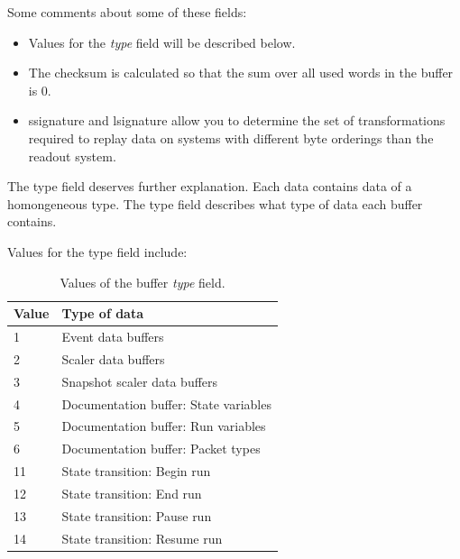    \begin{note}
   Some comments about some of these fields:
      \begin{itemize}
         \item Values for the {\em type} field will be described
            below.
         \item The checksum is calculated so that the sum over all
            used words in the buffer is 0.
         \item ssignature and lsignature allow you to determine
            the set of transformations required to replay data on 
            systems with different byte orderings than the readout 
            system.
      \end{itemize}
   \end{note}
   
   The type field deserves further explanation.  Each data contains
   data of a homongeneous type.  The type field describes what type 
   of data each buffer contains.
   
   Values for the type field include:
   
   \begin{table}[htb]
      \caption{Values of the buffer {\em type} field.}
      \begin{tabular}{|l|l|}
         \hline
         {\bf Value}         & {\bf Type of data } \\
         \hline
         1                & Event data buffers \\
         2                & Scaler data buffers \\
         3                & Snapshot scaler data buffers \\
         4                & Documentation buffer: State variables \\
         5                & Documentation buffer: Run variables \\
         6                & Documentation buffer: Packet types \\
         11              & State transition: Begin run \\
         12             &  State transition: End run \\
         13             & State transition: Pause run \\
         14             & State transition: Resume run \\
         \hline
      \end{tabular}
   \end{table}
   
